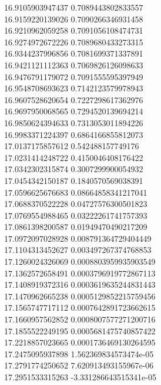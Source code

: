 {16.9105903947437 0.7089443802833557 \\
16.9159220139026 0.7090266346931458 \\
16.9210962059258 0.7091056108474731 \\
16.9274972672226 0.7089680433273315 \\
16.9344237996856 0.7081699371337891 \\
16.9421121112363 0.7069826126098633 \\
16.9476791179072 0.7091555595397949 \\
16.9548708693623 0.7142123579978943 \\
16.9607528620654 0.7227298617362976 \\
16.9697950068565 0.7294520139694214 \\
16.9850624394633 0.7313053011894226 \\
16.9983371224397 0.6864166855812073 \\
17.0137175857612 0.542488157749176 \\
17.0231414248722 0.4150046408176422 \\
17.0342302315874 0.3007299900054932 \\
17.0454342150187 0.1840570569038391 \\
17.0596625676683 0.08664858341217041 \\
17.0688370522228 0.04727576300501823 \\
17.0769554988465 0.03222261741757393 \\
17.0861398200587 0.01949470490217209 \\
17.0972097028928 0.008791364729404449 \\
17.1104313452627 0.003497267374768853 \\
17.1260024326069 0.0008803959935903549 \\
17.1362572658491 0.0003796919772867113 \\
17.1408919372316 0.0003619635244831443 \\
17.1470962665238 0.0005129852215759456 \\
17.1565747717112 0.0007642891723662615 \\
17.1660957562852 0.0008007577271200716 \\
17.1855522249195 0.0005681475740857422 \\
17.2218857023665 0.0001736469130264595 \\
17.2475095937898 1.562369834573474e-05 \\
17.2791774250652 7.620913493155967e-06 \\
17.2951533315263 -3.331286643515341e-05 \\
}
